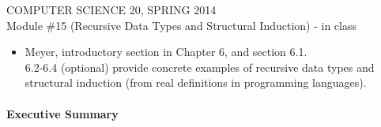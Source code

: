 \documentclass[12pt]{article}
\begin{document}
\textsl{}

\begin{center}
COMPUTER SCIENCE 20, SPRING 2014 \\
Module \#15 (Recursive Data Types and Structural Induction) - in class\\
\end{center}
\begin{itemize}
\item Meyer, introductory section in Chapter 6, and section 6.1.\\
6.2-6.4 (optional) provide concrete examples of recursive data types and structural induction (from real definitions in programming languages).
\end{itemize}

\paragraph*{Executive Summary}
\end{document}
